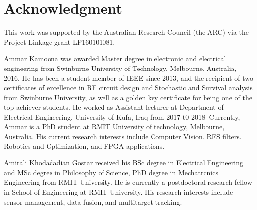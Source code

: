 \documentclass[journal]{IEEEtran}
\begin{document}
\section*{Acknowledgment}
This work was supported by the Australian Research Council (the ARC) via the Project Linkage grant LP160101081.


\ifCLASSOPTIONcaptionsoff
  \newpage
\fi














\begin{IEEEbiographynophoto}{Ammar Kamoona}
was awarded Master degree in electronic
and electrical engineering from Swinburne University of Technology,
Melbourne, Australia, 2016. He has been a student member of IEEE
since 2013, and the recipient of two certificates of excellence in RF
circuit design and Stochastic and Survival analysis from Swinburne
University, as well as a golden key certificate for being one of the top
achiever students. He worked as Assistant lecturer at Department of
Electrical Engineering, University of Kufa, Iraq from 2017 t0 2018.
Currently, Ammar is a PhD student at RMIT University of technology,
Melbourne, Australia. His current research interests include
Computer Vision, RFS filters, Robotics and Optimization, and FPGA
applications.
\end{IEEEbiographynophoto}

\begin{IEEEbiographynophoto}{Amirali Khodadadian Gostar}
received his BSc degree in Electrical
Engineering and MSc degree in Philosophy of Science, PhD degree in
Mechatronics Engineering from RMIT University. He is currently a
postdoctoral research fellow in School of Engineering at RMIT
University. His research interests include sensor management, data
fusion, and multitarget tracking.
\end{IEEEbiographynophoto}
\end{document}

